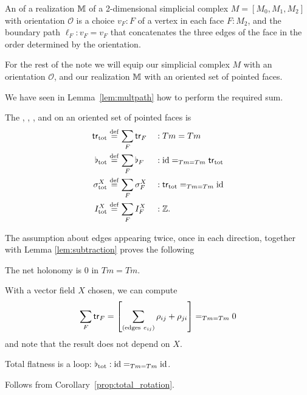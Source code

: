\begin{mydef}
An  of a realization \( \mathbb{M} \) of a 2-dimensional simplicial complex \( M=[M_0,M_1,M_2] \) with orientation \( \mathscr{O} \) is a choice \( v_F:F \) of a vertex in each face \( F:M_2 \), and the boundary path \( \ell_F:v_F=v_F \) that concatenates the three edges of the face in the order determined by the orientation.
\end{mydef}

For the rest of the note we will equip our simplicial complex \( M \) with an orientation \( \mathscr{O} \), and our realization \( \mathbb{M} \) with an oriented set of pointed faces.

We have seen in Lemma~\ref{lem:multpath} how to perform the required sum.
\begin{mydef}
The , , , and  on an oriented set of pointed faces is
\begin{equation}
\label{eq:tot_elements}
\begin{aligned}
\mathsf{tr}_{\mathrm{tot}}      & \stackrel{\mathrm{def}}{=} \sum_F\mathsf{tr}_F &&:Tm=Tm\\
\flat_{\mathrm{tot}}    & \stackrel{\mathrm{def}}{=} \sum_F\flat_F &&:\text{id}=_{Tm=Tm}\mathsf{tr}_{\mathrm{tot}}\\
\sigma^X_{\mathrm{tot}} & \stackrel{\mathrm{def}}{=} \sum_F\sigma^X_F &&:\mathsf{tr}_{\mathrm{tot}}=_{Tm=Tm}\text{id}\\
I^X_{\mathrm{tot}}      & \stackrel{\mathrm{def}}{=} \sum_F I^X_F &&:\mathbb{Z}.
\end{aligned}
\end{equation}
\end{mydef}

The assumption about edges appearing twice, once in each direction, together with Lemma \ref{lem:subtraction} proves the following
\begin{myprop}The net holonomy is \( 0 \) in \( Tm=Tm \).\label{prop:total_rotation}
\end{myprop}
\begin{myproof}
With a vector field \( X \) chosen, we can compute \[ \sum_F\mathsf{tr}_F=\left[\sum_{(\mathrm{edges\ }e_{ij})} \rho_{ij}+\rho_{ji}\right]=_{Tm=Tm}0 \] and note that the result does not depend on \( X \).
\end{myproof}

\begin{mycor}
Total flatness is a loop: \( \flat_{\mathrm{tot}}:\text{id}=_{Tm=Tm}\text{id} \).
\end{mycor}\begin{myproof}Follows from Corollary~\ref{prop:total_rotation}.\end{myproof}


